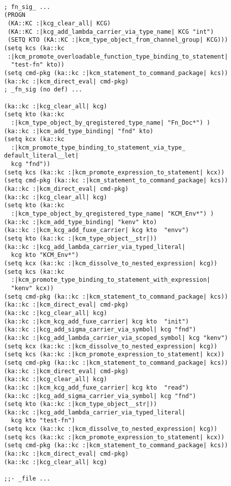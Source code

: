 \begin{lstlisting}[caption={%
\emblink{\#lst--rzd--\thelstlisting.pgvm-pdf}{Sample IR Code}},
  numbers = none, escapechar = !, 
  label={lst:rzd},
    basicstyle = \ttfamily\bfseries\footnotesize, 
	linewidth = 1.01\linewidth]

; fn_sig_ ...
(PROGN
 (KA::KC :|kcg_clear_all| KCG)
 (KA::KC :|kcg_add_lambda_carrier_via_type_name| KCG "int")
 (SETQ KTO (KA::KC :|kcm_type_object_from_channel_group| KCG)))
(setq kcs (ka::kc 
 :|kcm_promote_overloadable_function_type_binding_to_statement| 
  "test-fn" kto))
(setq cmd-pkg (ka::kc :|kcm_statement_to_command_package| kcs))
(ka::kc :|kcm_direct_eval| cmd-pkg)
; _fn_sig (no def) ...

(ka::kc :|kcg_clear_all| kcg)
(setq kto (ka::kc 
  :|kcm_type_object_by_qregistered_type_name| "Fn_Doc*") )
(ka::kc :|kcm_add_type_binding| "fnd" kto)
(setq kcx (ka::kc 
  :|kcm_promote_type_binding_to_statement_via_type_
default_literal__let| 
  kcg "fnd"))
(setq kcs (ka::kc :|kcm_promote_expression_to_statement| kcx))
(setq cmd-pkg (ka::kc :|kcm_statement_to_command_package| kcs))
(ka::kc :|kcm_direct_eval| cmd-pkg)
(ka::kc :|kcg_clear_all| kcg)
(setq kto (ka::kc 
  :|kcm_type_object_by_qregistered_type_name| "KCM_Env*") )
(ka::kc :|kcm_add_type_binding| "kenv" kto)
(ka::kc :|kcm_kcg_add_fuxe_carrier| kcg kto  "envv")
(setq kto (ka::kc :|kcm_type_object__str|))
(ka::kc :|kcg_add_lambda_carrier_via_typed_literal| 
  kcg kto "KCM_Env*")
(setq kcx (ka::kc :|kcm_dissolve_to_nested_expression| kcg))
(setq kcs (ka::kc 
  :|kcm_promote_type_binding_to_statement_with_expression| 
  "kenv" kcx))
(setq cmd-pkg (ka::kc :|kcm_statement_to_command_package| kcs))
(ka::kc :|kcm_direct_eval| cmd-pkg)
(ka::kc :|kcg_clear_all| kcg)
(ka::kc :|kcm_kcg_add_fuxe_carrier| kcg kto  "init")
(ka::kc :|kcg_add_sigma_carrier_via_symbol| kcg "fnd")
(ka::kc :|kcg_add_lambda_carrier_via_scoped_symbol| kcg "kenv")
(setq kcx (ka::kc :|kcm_dissolve_to_nested_expression| kcg))
(setq kcs (ka::kc :|kcm_promote_expression_to_statement| kcx))
(setq cmd-pkg (ka::kc :|kcm_statement_to_command_package| kcs))
(ka::kc :|kcm_direct_eval| cmd-pkg)
(ka::kc :|kcg_clear_all| kcg)
(ka::kc :|kcm_kcg_add_fuxe_carrier| kcg kto  "read")
(ka::kc :|kcg_add_sigma_carrier_via_symbol| kcg "fnd")
(setq kto (ka::kc :|kcm_type_object__str|))
(ka::kc :|kcg_add_lambda_carrier_via_typed_literal| 
  kcg kto "test-fn")
(setq kcx (ka::kc :|kcm_dissolve_to_nested_expression| kcg))
(setq kcs (ka::kc :|kcm_promote_expression_to_statement| kcx))
(setq cmd-pkg (ka::kc :|kcm_statement_to_command_package| kcs))
(ka::kc :|kcm_direct_eval| cmd-pkg)
(ka::kc :|kcg_clear_all| kcg)

;;- _file ...

\end{lstlisting}


